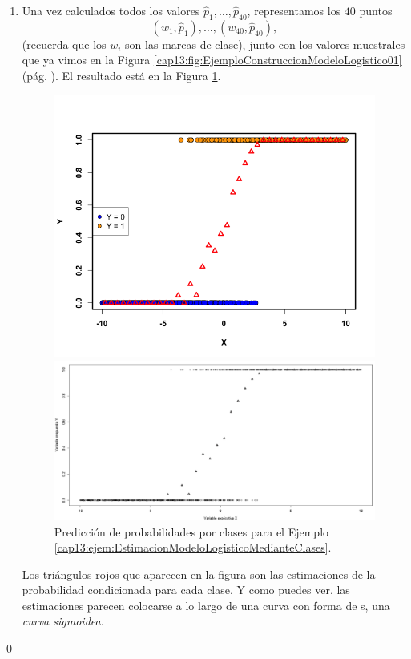 \begin{ejemplo}
\begin{enumerate}
  \item Una vez calculados todos los valores $\hat p_1,\ldots, \hat p_{40}$, representamos los $40$ puntos
      \[(w_1,\hat p_1), \ldots, (w_{40},\hat p_{40}),\]
      (recuerda que los $w_i$ son las marcas de clase), junto con los valores muestrales que ya vimos en la Figura \ref{cap13:fig:EjemploConstruccionModeloLogistico01} (pág. \pageref{cap13:fig:EjemploConstruccionModeloLogistico01}). El resultado está en la Figura \ref{cap13:fig:EjemploConstruccionModeloLogistico02}.
\begin{figure}[h!]
\begin{center}
\begin{enColor}
\includegraphics[width=13cm]{../fig/Cap13-EjemploConstruccionModeloLogistico02.png}
\end{enColor}
\begin{bn}
    \includegraphics[width=13cm]{../fig/Cap13-EjemploConstruccionModeloLogistico02-bn.png}
\end{bn}
\caption{Predicción de probabilidades por clases para el Ejemplo \ref{cap13:ejem:EstimacionModeloLogisticoMedianteClases}. }
\label{cap13:fig:EjemploConstruccionModeloLogistico02}
\end{center}
\end{figure}

    Los triángulos rojos que aparecen en la figura son las estimaciones de la probabilidad
    condicionada para cada clase. Y como puedes ver, las estimaciones parecen colocarse a lo
    largo de una curva con forma de s, una {\em curva sigmoidea}.
\end{enumerate}
\qed
\end{ejemplo}
